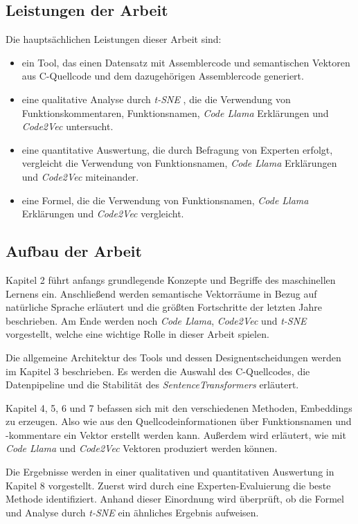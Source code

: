 \documentclass[12pt,letterpaper,ngerman]{article}
\begin{document}
\subsection{Leistungen der Arbeit}
Die hauptsächlichen Leistungen dieser Arbeit sind:
\begin{itemize}
  \item ein Tool, das einen Datensatz mit Assemblercode und semantischen 
    Vektoren aus C-Quellcode und dem dazugehörigen Assemblercode generiert.
  \item eine qualitative Analyse durch 
    \textit{t-SNE} \cite{JMLR:v9:vandermaaten08a}, die die Verwendung von 
    Funktionskommentaren, Funktionsnamen, 
    \textit{Code Llama} \cite{rozière2024codellamaopenfoundation} Erklärungen
    und  \textit{Code2Vec}  \cite{code2vec}
    untersucht.
  \item eine quantitative Auswertung, die durch Befragung von Experten erfolgt,
    vergleicht die Verwendung von Funktionsnamen, \textit{Code Llama} 
    Erklärungen und  \textit{Code2Vec}  miteinander.
  \item eine Formel, die die Verwendung von Funktionsnamen, \textit{Code Llama}
    Erklärungen und  \textit{Code2Vec}  vergleicht.
\end{itemize}
\pagebreak
\subsection{Aufbau der Arbeit}
Kapitel 2 führt anfangs grundlegende Konzepte und Begriffe des maschinellen 
Lernens ein. Anschließend werden semantische Vektorräume in Bezug auf 
natürliche Sprache erläutert und die größten Fortschritte der letzten Jahre 
beschrieben. Am Ende werden noch \textit{Code Llama},  \textit{Code2Vec}  und 
\textit{t-SNE} vorgestellt, welche eine wichtige Rolle in dieser Arbeit spielen.

Die allgemeine Architektur des Tools und dessen Designentscheidungen werden im Kapitel 3
beschrieben. Es werden die Auswahl des C-Quellcodes, die Datenpipeline und die 
Stabilität des \textit{SentenceTransformers} erläutert.

Kapitel 4, 5, 6 und 7 befassen sich mit den verschiedenen Methoden, Embeddings
zu erzeugen. Also wie aus den Quellcodeinformationen über Funktionsnamen und
-kommentare ein Vektor erstellt werden kann. Außerdem wird erläutert, wie mit
\textit{Code Llama} und  \textit{Code2Vec}  Vektoren produziert werden können.

Die Ergebnisse werden in einer qualitativen und quantitativen Auswertung in 
Kapitel 8 vorgestellt. Zuerst wird durch eine Experten-Evaluierung die beste
Methode identifiziert. Anhand dieser Einordnung wird überprüft, ob die Formel
und Analyse durch \textit{t-SNE} ein ähnliches Ergebnis aufweisen.
\end{document}
